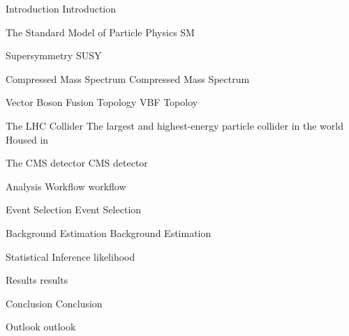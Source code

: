 \makeatletter
  \graphicspath{ {@path} }
\makeatother

\begin{frame}[fragile]{Introduction}
  Introduction
\end{frame}

\begin{frame}[fragile]{The Standard Model of Particle Physics}
  SM
\end{frame}

\begin{frame}[fragile]{Supersymmetry}
  SUSY
\end{frame}

\begin{frame}[fragile]{Compressed Mass Spectrum}
  Compressed Mass Spectrum
\end{frame}

\begin{frame}[fragile]{Vector Boson Fusion Topology}
  VBF Topoloy
\end{frame}

\begin{frame}[fragile]{The LHC Collider}
  The largest and highest-energy particle collider in the world
  Housed in 
\end{frame}

\begin{frame}[fragile]{The CMS detector}
  CMS detector
\end{frame}

\begin{frame}[fragile]{Analysis Workflow}
  workflow
\end{frame}

\begin{frame}[fragile]{Event Selection}
  Event Selection
\end{frame}

\begin{frame}[fragile]{Background Estimation}
  Background Estimation
\end{frame}

\begin{frame}[fragile]{Statistical Inference}
  likelihood
\end{frame}

\begin{frame}[fragile]{Results}
  results
\end{frame}

\begin{frame}[fragile]{Conclusion}
  Conclusion
\end{frame}

\begin{frame}[fragile]{Outlook}
  outlook
\end{frame}
